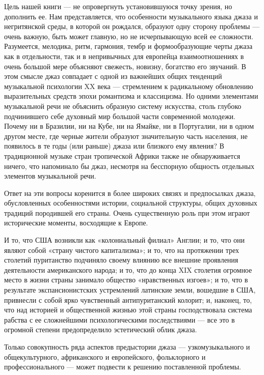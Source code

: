 Цель  нашей  книги  —  не опровергнуть  установившуюся  точку  зрения,
но  дополнить ее.  Нам  представляется,  что особенности  музыкального
языка  джаза и  негритянской среды,  в которой  он рождался,  образуют
одну  сторону проблемы  —  очень  важную, быть  может  главную, но  не
исчерпывающую всей ее сложности. Разумеется, мелодика, ритм, гармония,
тембр  и  формообразующие черты  джаза  как  в  отдельности, так  и  в
непривычных  для  европейца  взаимоотношениях  в  очень  большой  мере
объясняют  свежесть, новизну,  богатство его  звучаний. В  этом смысле
джаз  совпадает  с  одной  из важнейших  общих  тенденций  музыкальной
психологии   XX  века   —   стремлением   к  радикальному   обновлению
выразительных  средств  эпохи  романтизма  и  классицизма.  Но  одними
элементами музыкальной  речи не объяснить образную  систему искусства,
столь глубоко подчинившего себе духовный мир большой части современной
молодежи.  Почему ни  в  Бразилии, ни  на  Кубе, ни  на  Ямайке, ни  в
Португалии,  ни  в одном  другом  месте,  где черные  жители  образуют
значительную  часть населения,  не появилось  в те  годы (или  раньше)
джаза  или   близкого  ему   явления?  В  традиционной   музыке  стран
тропической Африки  также не обнаруживается ничего,  что напоминало бы
джаз, несмотря на бесспорную  общность отдельных элементов музыкальной
речи.

Ответ на эти  вопросы коренится в более широких  связях и предпосылках
джаза,  обусловленных  особенностями  истории,  социальной  структуры,
общих духовных традиций породившей его страны. Очень существенную роль
при этом играют исторические моменты, восходящие к Европе.

И  то,  что США  возникли  как  «колониальный  филиал» Англии;  и  то,
что  они являют  собой  «страну  чистого капитализма»;  и  то, что  на
протяжении  трех столетий  пуританство  подчиняло  своему влиянию  все
внешние  проявления деятельности  американского народа;  и то,  что до
конца XIX  столетия огромное  место в  жизни страны  занимало общество
«нравственных  изгоев»;  и  то,  что  в  результате  экспансионистских
устремлений латинские  земли, вошедшие в  США, привнесли с  собой ярко
чувственный антипуританский колорит; и,  наконец, то, что над историей
и общественной жизнью этой страны  господствовала система рабства с ее
сложнейшими  психологическими  последствиями  —  все  это  в  огромной
степени предопределило эстетический облик джаза.

Только совокупность ряда аспектов предыстории джаза — узкомузыкального
и  общекультурного,   африканского  и  европейского,   фольклорного  и
профессионального — может подвести к решению поставленной проблемы.

